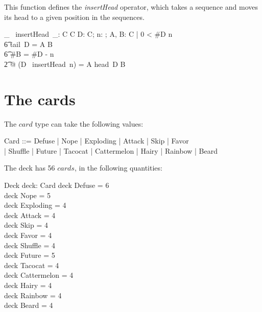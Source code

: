 \documentclass[11pt, fuzz]{article}
\begin{document}
This function defines the \emph{insertHead} operator, which takes a sequence and moves its head to a given position in the sequences. 

\newcommand{\insertHead}{~insertHead~}

\begin{gendef}[C]
    \_ \insertHead \_: \seq C \cross \nat \fun \seq C
\where
    \forall D: \seq C; n: \nat; A, B: \seq C | 0 < \#D \leq n\\
    \t6 \land tail~D = A \cat B\\
    \t6 \land \#B = \#D - n\\
    \t2 @ (D \insertHead n) = A \cat \langle head~D \rangle \cat B
\end{gendef}

\section{The cards}

The $card$ type can take the following values:

\begin{zed}
    Card ::= Defuse | Nope | Exploding | Attack | Skip | Favor \\| Shuffle | Future | Tacocat | Cattermelon | Hairy | Rainbow | Beard
\end{zed}

The deck has 56 $cards$, in the following quantities:

\begin{schema}{Deck}
    deck: \bag Card
\where
    deck \bcount Defuse      = 6 \\
    deck \bcount Nope        = 5 \\
    deck \bcount Exploding   = 4 \\
    deck \bcount Attack      = 4 \\
    deck \bcount Skip        = 4 \\
    deck \bcount Favor       = 4 \\
    deck \bcount Shuffle     = 4 \\
    deck \bcount Future      = 5 \\
    deck \bcount Tacocat     = 4 \\
    deck \bcount Cattermelon = 4 \\
    deck \bcount Hairy       = 4 \\
    deck \bcount Rainbow     = 4 \\
    deck \bcount Beard       = 4 \\
\end{schema}
\end{document}
